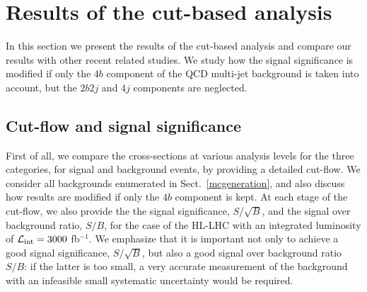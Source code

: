 
\section{Results of the cut-based analysis}

\label{sec:results}

In this section we present the results of the 
cut-based analysis and
compare our results with other recent related studies.
%
We study how the signal significance
is modified if only the $4b$ component of the
QCD multi-jet background is taken into account,
but the $2b2j$ and $4j$ components are neglected.
%


\subsection{Cut-flow and signal significance}

First of all, we compare the cross-sections at various
analysis levels for the three categories, for signal and background events,
by providing a detailed cut-flow.
%
We consider all backgrounds enumerated in Sect.~\ref{mcgeneration},
and also discuss how results are modified if only the $4b$
component is kept.
%
At each stage of the cut-flow, we also provide the
the signal significance, $S/\sqrt{B}$, and the signal
over background ratio, $S/B$, for the case of the
 HL-LHC with
an integrated luminosity of $\mathcal{L}_{\rm int}
=3000$ fb$^{-1}$.
%
%
We emphasize that it is important not only to achieve a good signal
significance, $S/\sqrt{B}$, but also a good signal over background ratio $S/B$:
if the latter is too small, a very accurate
measurement of the background with an infeasible small
systematic uncertainty would be required.


   

